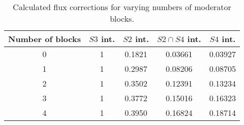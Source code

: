 \begin{table}
  \centering
  \begin{tabular}{|c|c|c|c|c|}
    \hline
    Number of blocks & $\mathit{S3}$ int. & $\mathit{S2}$ int. & $\mathit{S2} \cap \mathit{S4}$ int. & $\mathit{S4}$ int. \\
    \hline
    0 & 1 & 0.1821 & 0.03661 & 0.03927 \\
    1 & 1 & 0.2987 & 0.08206 & 0.08705 \\
    2 & 1 & 0.3502 & 0.12391 & 0.13234 \\
    3 & 1 & 0.3772 & 0.15016 & 0.16323 \\
    4 & 1 & 0.3950 & 0.16824 & 0.18714 \\
    \hline		
  \end{tabular}
  \caption{Calculated flux corrections for varying numbers of moderator blocks.}
  \label{tab:fluxFactors}
\end{table}
    
